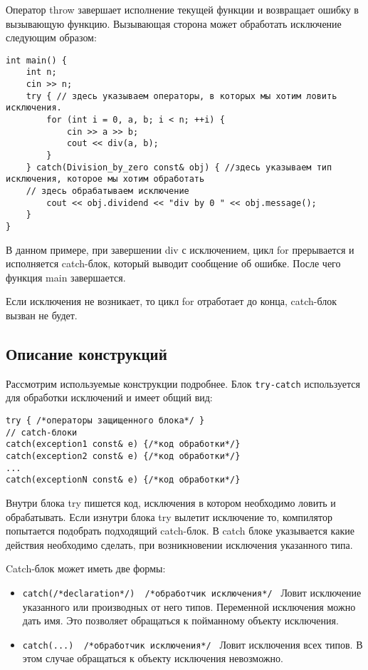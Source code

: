 Оператор throw завершает исполнение текущей функции и возвращает ошибку в вызывающую функцию. Вызывающая сторона может обработать исключение следующим образом:

\begin{verbatim}
int main() {
    int n;
    cin >> n;
    try { // здесь указываем операторы, в которых мы хотим ловить исключения.
        for (int i = 0, a, b; i < n; ++i) {
            cin >> a >> b;
            cout << div(a, b);
        }
    } catch(Division_by_zero const& obj) { //здесь указываем тип исключения, которое мы хотим обработать
    // здесь обрабатываем исключение
        cout << obj.dividend << "div by 0 " << obj.message();
    }
}
\end{verbatim}

В данном примере, при завершении div с исключением, цикл for прерывается и исполняется catch-блок, который выводит сообщение об ошибке. После чего функция main завершается.

Если исключения не возникает, то цикл for отработает до конца, catch-блок вызван не будет.

\subsection{Описание конструкций}
Рассмотрим используемые конструкции подробнее. Блок \texttt{try-catch} используется для обработки исключений и имеет общий вид:
\begin{verbatim}
try { /*операторы защищенного блока*/ }
// catch-блоки
catch(exception1 const& e) {/*код обработки*/}
catch(exception2 const& e) {/*код обработки*/}
...
catch(exceptionN const& e) {/*код обработки*/}

\end{verbatim}
Внутри блока try пишется код, исключения в котором необходимо ловить и обрабатывать. Если изнутри блока try вылетит исключение то, компилятор попытается подобрать подходящий catch-блок. В catch блоке указывается какие действия необходимо сделать, при возникновении исключения указанного типа.

Catch-блок может иметь две формы:
\begin{itemize}
    \item
    \texttt{catch(/*declaration*/) { /*обработчик исключения*/ }} Ловит исключение указанного или производных от него типов. Переменной исключения можно дать имя. Это позволяет обращаться к пойманному объекту исключения.
    \item
    \texttt{catch(...) { /*обработчик исключения*/ }}
    Ловит исключения всех типов. В этом случае обращаться к объекту исключения невозможно.
\end{itemize}

